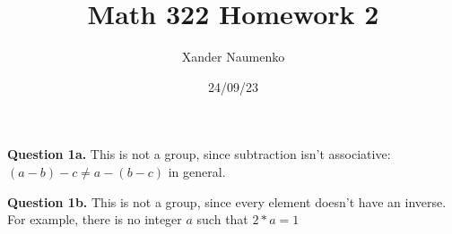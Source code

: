 \documentclass[letterpaper, reqno,11pt]{article}
\begin{document}
\title{Math 322 Homework 2}
\date{24/09/23}
\author{Xander Naumenko}
\maketitle

{\medskip\noindent\bf Question 1a.} This is not a group, since subtraction isn't associative: $(a-b)-c\neq a-(b-c)$ in general.

{\medskip\noindent\bf Question 1b.} This is not a group, since every element doesn't have an inverse. For example, there is no integer $a$ such that $2*a=1$
\end{document}
